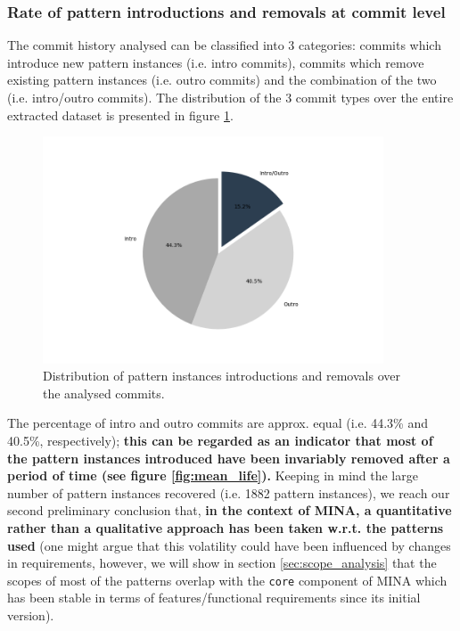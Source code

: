\subsubsection{Rate of pattern introductions and removals at commit level}
The commit history analysed can be classified into 3 categories: commits which introduce new pattern instances (i.e. intro commits), commits which remove existing pattern instances (i.e. outro commits) and the combination of the two (i.e. intro/outro commits). The distribution of the 3 commit types over the entire extracted dataset is presented in figure \ref{fig:pattern_commit_percentage}. 
\begin{figure}[H]
    \centering
    \includegraphics[width =0.9\textwidth]{images/graphs/intro_outro_per.png}
    \caption{Distribution of pattern instances introductions and removals over the analysed commits.}
    \label{fig:pattern_commit_percentage}
\end{figure}

The percentage of intro and outro commits are approx. equal (i.e. 44.3\% and 40.5\%, respectively); \textbf{this can be regarded as an indicator that most of the pattern instances introduced have been invariably removed after a period of time (see figure \ref{fig:mean_life}).} Keeping in mind the large number of pattern instances recovered (i.e. 1882 pattern instances), we reach our second preliminary conclusion that, \textbf{in the context of MINA, a quantitative rather than a qualitative approach has been taken w.r.t. the patterns used} (one might argue that this volatility could have been influenced by changes in requirements, however, we will show in section \ref{sec:scope_analysis} that the scopes of most of the patterns overlap with the \texttt{core} component of MINA which has been stable in terms of features/functional requirements since its initial version).  

